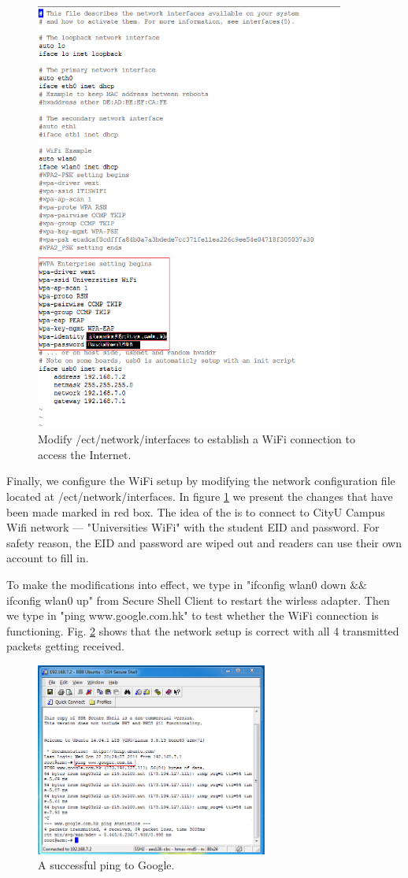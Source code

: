 \documentclass[12pt,journal,draftclsnofoot,onecolumn]{IEEEtran}
\begin{document}
\begin{figure}[htb]
	\centering
	\includegraphics[width=4in]{./figs/wifi.PNG}
	\caption{Modify /ect/network/interfaces to establish a WiFi connection to access the Internet.}
	\label{wifi}
\end{figure}

Finally, we configure the WiFi setup by modifying the network configuration file located at /ect/network/interfaces.
In figure \ref{wifi} we present the changes that have been made marked in red box. The idea of the is to connect to CityU Campus Wifi network --- "Universities WiFi" with the student EID and password. For safety reason, the EID and password are wiped out and readers can use their own account to fill in.



To make the modifications into effect, we type in "ifconfig wlan0 down $\&\&$ ifconfig wlan0 up" from Secure Shell Client to restart the wirless adapter. Then we type in "ping www.google.com.hk" to test whether the WiFi connection is functioning. Fig. \ref{ping} shows that the network setup is correct with all 4 transmitted packets getting received.

\begin{figure}[htb]
	\centering
	\includegraphics[width=3in]{./figs/ping.PNG}
	\caption{A successful ping to Google.}
	\label{ping}
\end{figure}
\end{document}
